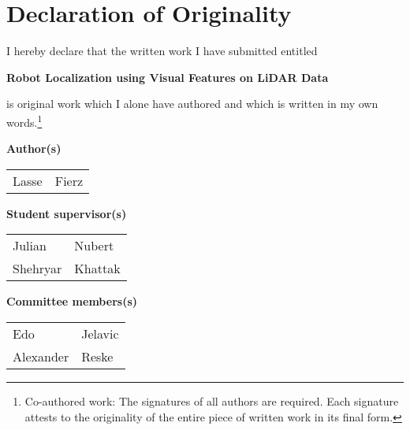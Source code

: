 
\section{Declaration of Originality}

\vspace{0.5cm}

I hereby declare that the written work I have submitted entitled

\vspace{0.5cm}

\textbf{Robot Localization using Visual Features on LiDAR Data}

\vspace{0.5cm}

is original work which I alone have authored and which is written in my own words.\footnote{Co-authored work: The signatures of all authors are required. Each signature attests to the originality of the entire piece of written work in its final form.}

\vspace{1cm}

\textbf{Author(s)}

\vspace{0.5cm}

\begin{tabular}{ p{5cm} p{5cm} }
  Lasse & Fierz \\
\end{tabular}

\vspace{0.5cm}

\textbf{Student supervisor(s)}

\vspace{0.5cm}

\begin{tabular}{ p{5cm} p{5cm} }
  Julian & Nubert \vspace{5mm}\\
  Shehryar & Khattak\\
\end{tabular}

\vspace{0.5cm}

\textbf{Committee members(s)}

\vspace{0.5cm}

\begin{tabular}{ p{5cm} p{5cm} }
  Edo & Jelavic \vspace{0.5cm} \\
  Alexander & Reske\\
\end{tabular}

